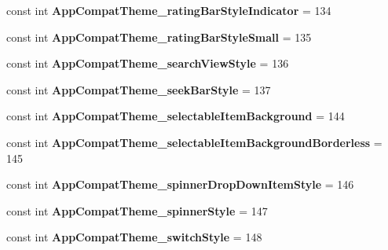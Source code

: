 \begin{DoxyCompactItemize}
const int {\bfseries App\+Compat\+Theme\+\_\+rating\+Bar\+Style\+Indicator} = 134
\item 
\mbox{\label{classst_delivery_1_1_resource_1_1_styleable_a0351d6a4e66acef10a2d515fafcc1b6d}} 
const int {\bfseries App\+Compat\+Theme\+\_\+rating\+Bar\+Style\+Small} = 135
\item 
\mbox{\label{classst_delivery_1_1_resource_1_1_styleable_a35689b92c644acc9758e4570cbb50663}} 
const int {\bfseries App\+Compat\+Theme\+\_\+search\+View\+Style} = 136
\item 
\mbox{\label{classst_delivery_1_1_resource_1_1_styleable_a73af1e2b1ca84610d158b839cbff5624}} 
const int {\bfseries App\+Compat\+Theme\+\_\+seek\+Bar\+Style} = 137
\item 
\mbox{\label{classst_delivery_1_1_resource_1_1_styleable_a8711f94b7598c15c56975497af5fa69b}} 
const int {\bfseries App\+Compat\+Theme\+\_\+selectable\+Item\+Background} = 144
\item 
\mbox{\label{classst_delivery_1_1_resource_1_1_styleable_a04deb9fc7b3aa81c689bda84a095f06d}} 
const int {\bfseries App\+Compat\+Theme\+\_\+selectable\+Item\+Background\+Borderless} = 145
\item 
\mbox{\label{classst_delivery_1_1_resource_1_1_styleable_a1881a78115818e3c7af0c108d6a1e6fd}} 
const int {\bfseries App\+Compat\+Theme\+\_\+spinner\+Drop\+Down\+Item\+Style} = 146
\item 
\mbox{\label{classst_delivery_1_1_resource_1_1_styleable_a6720d18ae5eb7b2fe59f1d7366e8a60a}} 
const int {\bfseries App\+Compat\+Theme\+\_\+spinner\+Style} = 147
\item 
\mbox{\label{classst_delivery_1_1_resource_1_1_styleable_a6b44c1d76862349c24c198f457867ccf}} 
const int {\bfseries App\+Compat\+Theme\+\_\+switch\+Style} = 148
\item 
\mbox{\label{classst_delivery_1_1_resource_1_1_styleable_ae11400302ec62e8619fb1116dddfdea4}} 

\end{DoxyCompactItemize}
